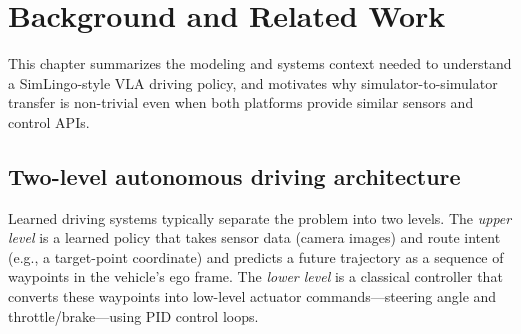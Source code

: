 \chapter{Background and Related Work}
\label{ch:background}

This chapter summarizes the modeling and systems context needed to understand a SimLingo-style VLA driving policy, and motivates why simulator-to-simulator transfer is non-trivial even when both platforms provide similar sensors and control APIs.

\section{Two-level autonomous driving architecture}
\label{sec:two-level}
Learned driving systems typically separate the problem into two levels. The \emph{upper level} is a learned policy that takes sensor data (camera images) and route intent (e.g., a target-point coordinate) and predicts a future trajectory as a sequence of waypoints in the vehicle's ego frame. The \emph{lower level} is a classical controller that converts these waypoints into low-level actuator commands---steering angle and throttle/brake---using PID control loops.

